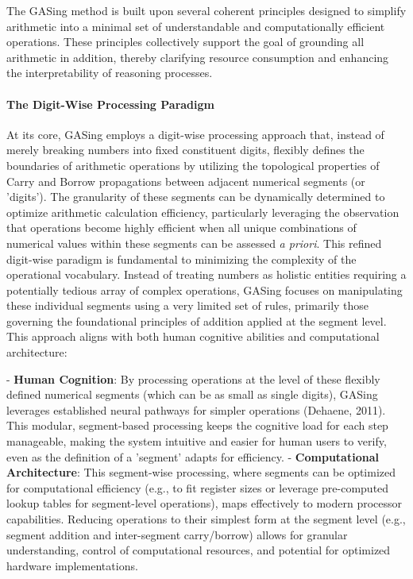 The GASing method is built upon several coherent principles designed to simplify arithmetic into a minimal set of understandable and computationally efficient operations. These principles collectively support the goal of grounding all arithmetic in addition, thereby clarifying resource consumption and enhancing the interpretability of reasoning processes.
\paragraph{The Digit-Wise Processing Paradigm}

At its core, GASing employs a digit-wise processing approach that, instead of merely breaking numbers into fixed constituent digits, flexibly defines the boundaries of arithmetic operations by utilizing the topological properties of Carry and Borrow propagations between adjacent numerical segments (or 'digits'). The granularity of these segments can be dynamically determined to optimize arithmetic calculation efficiency, particularly leveraging the observation that operations become highly efficient when all unique combinations of numerical values within these segments can be assessed \emph{a priori}. This refined digit-wise paradigm is fundamental to minimizing the complexity of the operational vocabulary. Instead of treating numbers as holistic entities requiring a potentially tedious array of complex operations, GASing focuses on manipulating these individual segments using a very limited set of rules, primarily those governing the foundational principles of addition applied at the segment level. This approach aligns with both human cognitive abilities and computational architecture:

- \textbf{Human Cognition}: By processing operations at the level of these flexibly defined numerical segments (which can be as small as single digits), GASing leverages established neural pathways for simpler operations (Dehaene, 2011). This modular, segment-based processing keeps the cognitive load for each step manageable, making the system intuitive and easier for human users to verify, even as the definition of a 'segment' adapts for efficiency.
- \textbf{Computational Architecture}: This segment-wise processing, where segments can be optimized for computational efficiency (e.g., to fit register sizes or leverage pre-computed lookup tables for segment-level operations), maps effectively to modern processor capabilities. Reducing operations to their simplest form at the segment level (e.g., segment addition and inter-segment carry/borrow) allows for granular understanding, control of computational resources, and potential for optimized hardware implementations.


